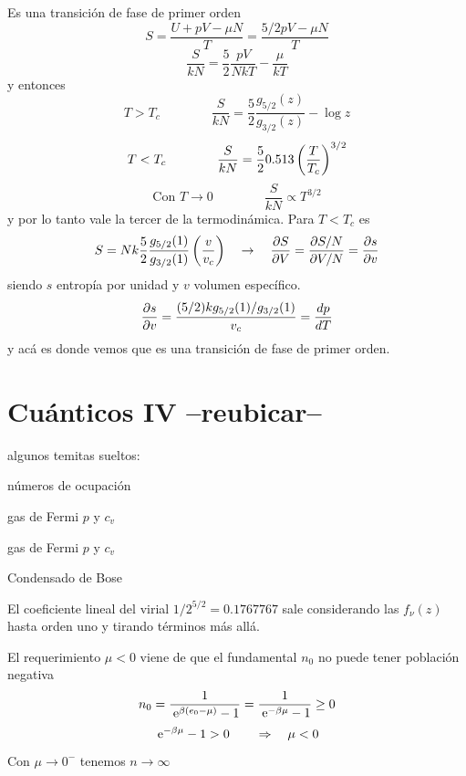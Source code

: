 \documentclass[10pt,oneside]{CBFT_book}
\begin{document}
\begin{itemize}
Es una transición de fase de primer orden 
 \[
	S = \frac{U + pV - \mu N}{T} = \frac{ 5/2 pV - \mu N }{T}
 \]
 \[
	\frac{S}{kN} = \frac{5}{2} \frac{pV}{NkT} - \frac{\mu}{kT}
 \]
y entonces 
 \[
	T > T_c \qquad \qquad \frac{S}{kN} = \frac{5}{2} \frac{ g_{5/2}(z) }{ g_{3/2}(z) } - \log z
 \]
 \[
	T < T_c \qquad \qquad \frac{S}{kN} = \frac{5}{2} 0.513 \left( \frac{ T }{ T_c } \right)^{3/2}
 \]
 \[
	\text{Con } T \to 0 \qquad \qquad \frac{S}{kN} \propto T^{3/2} 
 \]
y por lo tanto vale la tercer de la termodinámica.
Para $ T < T_c $ es
\[
	S = N k \frac{5}{2} \frac{ g_{5/2}(1) }{ g_{3/2}(1) } \left( \frac{ v }{ v_c } \right) \quad \to \quad 
	\frac{\partial^{\hspace{-0.05em}} {S}}{\partial {V}^{\hspace{-0.05em}}} = \frac{\partial S/N}{\partial V/N} = \frac{\partial^{\hspace{-0.05em}} {s}}{\partial {v}^{\hspace{-0.05em}}}
\]
siendo $s$ entropía por unidad y $v$ volumen específico.
\[
	\frac{\partial^{\hspace{-0.05em}} {s}}{\partial {v}^{\hspace{-0.05em}}} =  \frac{ ( 5/2 ) k g_{5/2}(1) / g_{3/2}(1) }{v_c} = \frac{d^{\hspace{-0.05em}} {p}}{d {T}^{\hspace{-0.05em}}}
\]
y acá es donde vemos que es una transición de fase de primer orden.
\end{itemize}



\section{Cuánticos IV --reubicar--}

algunos temitas sueltos:

números de ocupación

gas de Fermi $p$ y $c_v$

gas de Fermi $p$ y $c_v$

Condensado de Bose


El coeficiente lineal del virial $ 1/ 2^{5/2} = 0.1767767 $ sale considerando las $ f_{\nu}(z) $ hasta orden
uno y tirando términos más allá.


El requerimiento $ \mu < 0 $ viene de que el fundamental $ n_0 $ no puede tener población negativa
\[
	n_0 = \frac{1}{\:\mathrm{e}^{\beta(e_0 - \mu)} -1} = \frac{1}{\:\mathrm{e}^{-\beta\mu} -1} \geq 0
\]
\[
	\:\mathrm{e}^{-\beta\mu} -1 > 0 \qquad \Rightarrow \quad \mu < 0
\]
Con $\mu \to 0^-$ tenemos $ n \to \infty $
\end{document}
